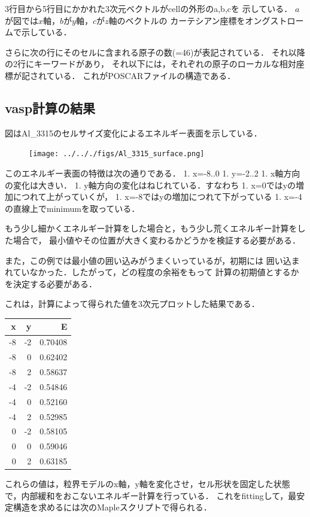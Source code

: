 3行目から5行目にかかれた3次元ベクトルがcellの外形のa,b,cを 示している．
\(a\)が図では\(x\)軸，\(b\)が\(y\)軸，\(c\)が\(z\)軸のベクトルの
カーテシアン座標をオングストロームで示している．

さらに次の行にそのセルに含まれる原子の数(=46)が表記されている．
それ以降の2行にキーワードがあり，
それ以下には，それぞれの原子のローカルな相対座標が記されている．
これがPOSCARファイルの構造である．

    \subsection{vasp計算の結果}\label{vaspux8a08ux7b97ux306eux7d50ux679c}

    図はAl\_3315のセルサイズ変化によるエネルギー表面を示している．

\begin{figure}[H][htbp]
\centering
\begin{center}
\texttt{[image: ../.././figs/Al\_3315\_surface.png]}
\end{center}
\caption{}

\label{fig:}
\end{figure}

    このエネルギー表面の特徴は次の通りである． 1. x=-8..0 1. y=-2..2 1.
x軸方向の変化は大きい． 1. y軸方向の変化はねじれている．すなわち 1.
x=0ではyの増加につれて上がっていくが， 1.
x=-8ではyの増加につれて下がっている 1.
x=-4の直線上でminimumを取っている．

もう少し細かくエネルギー計算をした場合と，もう少し荒くエネルギー計算をした場合で，
最小値やその位置が大きく変わるかどうかを検証する必要がある．

また，この例では最小値の囲い込みがうまくいっているが，初期には
囲い込まれていなかった．したがって，どの程度の余裕をもって
計算の初期値とするかを決定する必要がある．

    これは，計算によって得られた値を3次元プロットした結果である．

\begin{longtable}[]{@{}rrr@{}}
\toprule
x & y & E\tabularnewline
\midrule
\endhead
-8 & -2 & 0.70408\tabularnewline
-8 & 0 & 0.62402\tabularnewline
-8 & 2 & 0.58637\tabularnewline
-4 & -2 & 0.54846\tabularnewline
-4 & 0 & 0.52160\tabularnewline
-4 & 2 & 0.52985\tabularnewline
0 & -2 & 0.58105\tabularnewline
0 & 0 & 0.59046\tabularnewline
0 & 2 & 0.63185\tabularnewline
\bottomrule
\end{longtable}

これらの値は，粒界モデルのx軸，y軸を変化させ，セル形状を固定した状態で，内部緩和をおこないエネルギー計算を行っている．
これをfittingして，最安定構造を求めるには次のMapleスクリプトで得られる．

